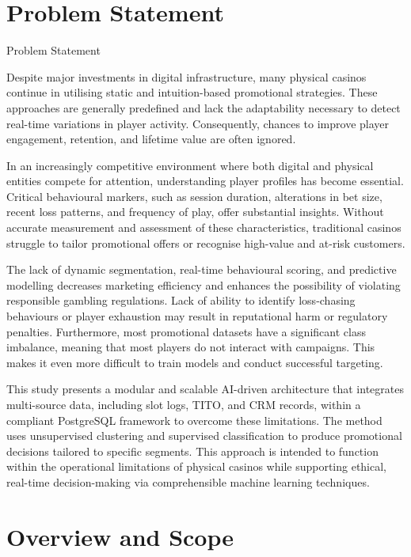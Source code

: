 \documentclass[12pt,a4paper]{report}
\begin{document}
\section{Problem Statement}

Problem Statement

 Despite major investments in digital infrastructure, many physical casinos continue in utilising static and intuition-based promotional strategies.  These approaches are generally predefined and lack the adaptability necessary to detect real-time variations in player activity.  Consequently, chances to improve player engagement, retention, and lifetime value are often ignored.

In an increasingly competitive environment where both digital and physical entities compete for attention, understanding player profiles has become essential.  Critical behavioural markers, such as session duration, alterations in bet size, recent loss patterns, and frequency of play, offer substantial insights.  Without accurate measurement and assessment of these characteristics, traditional casinos struggle to tailor promotional offers or recognise high-value and at-risk customers.

The lack of dynamic segmentation, real-time behavioural scoring, and predictive modelling decreases marketing efficiency and enhances the possibility of violating responsible gambling regulations. Lack of ability to identify loss-chasing behaviours or player exhaustion may result in reputational harm or regulatory penalties. Furthermore, most promotional datasets have a significant class imbalance, meaning that most players do not interact with campaigns. This makes it even more difficult to train models and conduct successful targeting.


 This study presents a modular and scalable AI-driven architecture that integrates multi-source data, including slot logs, TITO, and CRM records, within a compliant PostgreSQL framework to overcome these limitations.  The method uses unsupervised clustering and supervised classification to produce promotional decisions tailored to specific segments.  This approach is intended to function within the operational limitations of physical casinos while supporting ethical, real-time decision-making via comprehensible machine learning techniques.


\section{Overview and Scope}
\end{document}
